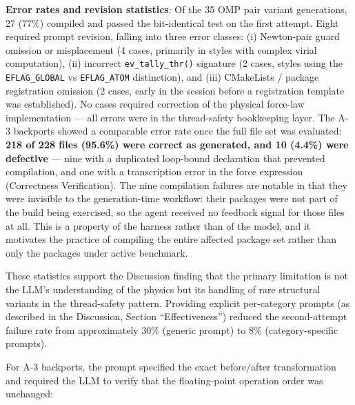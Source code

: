 \documentclass[
  11pt,
]{article}
\begin{document}
\textbf{Error rates and revision statistics}: Of the 35 OMP pair variant
generations, 27 (77\%) compiled and passed the bit-identical test on the
first attempt. Eight required prompt revision, falling into three error
classes: (i) Newton-pair guard omission or misplacement (4 cases,
primarily in styles with complex virial computation), (ii) incorrect
\texttt{ev\_tally\_thr()} signature (2 cases, styles using the
\texttt{EFLAG\_GLOBAL} vs \texttt{EFLAG\_ATOM} distinction), and (iii)
CMakeLists / package registration omission (2 cases, early in the
session before a registration template was established). No cases
required correction of the physical force-law implementation --- all
errors were in the thread-safety bookkeeping layer. The A-3 backports
showed a comparable error rate once the full file set was evaluated:
\textbf{218 of 228 files (95.6\%) were correct as generated, and 10
(4.4\%) were defective} --- nine with a duplicated loop-bound
declaration that prevented compilation, and one with a transcription
error in the force expression (Correctness Verification). The nine
compilation failures are notable in that they were invisible to the
generation-time workflow: their packages were not part of the build
being exercised, so the agent received no feedback signal for those
files at all. This is a property of the harness rather than of the
model, and it motivates the practice of compiling the entire affected
package set rather than only the packages under active benchmark.

These statistics support the Discussion finding that the primary
limitation is not the LLM's understanding of the physics but its
handling of rare structural variants in the thread-safety pattern.
Providing explicit per-category prompts (as described in the Discussion,
Section ``Effectiveness'') reduced the second-attempt failure rate from
approximately 30\% (generic prompt) to 8\% (category-specific prompts).

For A-3 backports, the prompt specified the exact before/after
transformation and required the LLM to verify that the floating-point
operation order was unchanged:
\end{document}
